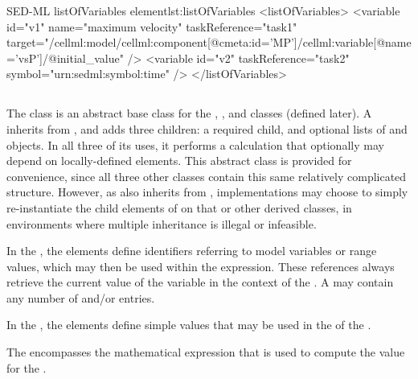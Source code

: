 \begin{blockChanged}
\begin{myXmlLst}{SED-ML listOfVariables element}{lst:listOfVariables}
<listOfVariables>
	<variable id="v1" name="maximum velocity" taskReference="task1" 
		target="/cellml:model/cellml:component[@cmeta:id='MP']/cellml:variable[@name='vsP']/@initial_value" />
	<variable id="v2" taskReference="task2" symbol="urn:sedml:symbol:time" />
</listOfVariables>
\end{myXmlLst}


\subsection{}
\label{class:calculation}

The \Calculation class is an abstract base class for the \ComputeChange, \DataGenerator, and \FunctionalRange classes (defined later).  A \Calculation inherits from \SedBase, and adds three children:  a required \Math child, and optional lists of \Variable and \Parameter objects.  In all three of its uses, it performs a calculation that optionally may depend on locally-defined elements.  This abstract class is provided for convenience, since all three other classes contain this same relatively complicated structure.  However, as \FunctionalRange also inherits from \Range, implementations may choose to simply re-instantiate the child elements of \Calculation on that or other derived classes, in environments where multiple inheritance is illegal or infeasible.


In the \ListOfVariables, the \Variable elements define identifiers referring to model variables or range values, which may then be used within the \Math expression. These references always retrieve the current value of the variable in the context of the \Calculation.  A \ListOfVariables may contain any number of \Variable and/or \DependentVariable entries.

In the \ListOfParameters, the \Parameter elements define simple values that may be used in the \Math of the \Calculation.

The \Math encompasses the mathematical expression that is used to compute the value for the \Calculation.


\end{blockChanged}
